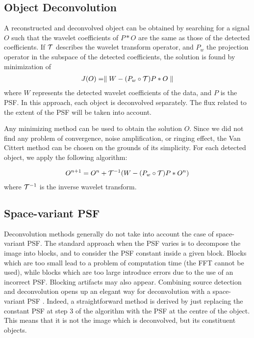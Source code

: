 \documentclass[11pt,a4paper]{article}
\begin{document}
\subsection{Object Deconvolution}

A reconstructed and deconvolved object can be obtained
by searching for a signal $O$ such that
the wavelet coefficients of $P*O$ are the same as those of the 
detected coefficients. If $\cal T$ describes the wavelet transform operator, 
and $P_w$ the projection operator in the subspace of the detected 
coefficients,
 the solution is found by minimization of
\begin{eqnarray}
J(O) = \parallel W - (P_w \circ {\cal T}) P * O  \parallel
\label{eqn_obj_rec}
\end{eqnarray}
where $W$ represents the detected wavelet coefficients of the data, and 
$P$ is the PSF. In this approach, each object is 
deconvolved
separately. The flux related to the extent of the PSF will be taken into 
account.

Any minimizing method can be used to obtain the solution $O$. Since we did 
not
find any problem of convergence, noise amplification, or ringing 
effect, the Van Cittert method can be chosen on the grounds of its simplicity.
For each detected object, we apply the following algorithm:

\begin{eqnarray}
O^{n+1} = O^{n} + {\cal T}^{-1}(W - (P_w \circ {\cal T}) P * O^{n})
\end{eqnarray}
where ${\cal T}^{-1}$ is the inverse wavelet transform.

\subsection{Space-variant PSF}
Deconvolution methods generally do not take into account the case of 
space-variant PSF. The standard approach when the PSF varies is to decompose
the image into blocks, and to consider the PSF constant inside a 
given block. Blocks which are too small lead to a problem of computation time 
(the 
FFT cannot be used), while blocks which are too large introduce errors 
due to the use of an incorrect PSF. 
Blocking artifacts may also appear. Combining
source detection and deconvolution opens up an elegant way for 
deconvolution
with a space-variant PSF \cite{starck:sta00_3}. 
Indeed, a straightforward method is derived by 
just
replacing the constant PSF at step 3 of the algorithm with the PSF at the
centre of the object. This means that it is not the image which is 
deconvolved,
but its constituent objects.
\end{document}
